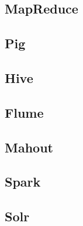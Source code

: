 \subsection{MapReduce}
\subsection{Pig}
\subsection{Hive}
\subsection{Flume}
\subsection{Mahout}
\subsection{Spark}
\subsection{Solr}

